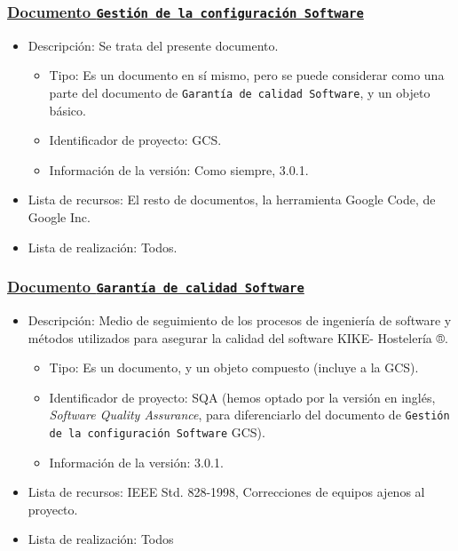 \documentclass[spanish,a4paper,11pt, twoside]{report}	%
\begin{document}
			\subsubsection{\underline{Documento \texttt{Gestión de la configuración Software}}}
			\begin{itemize}	
				\item{Descripción:} Se trata del presente documento.
					\begin{itemize}	
						\item{Tipo:} Es un documento en sí mismo, pero se puede considerar como una parte del documento de \texttt{Garantía de calidad Software}, y un objeto básico. 
						\item{Identificador de proyecto:} GCS.
						\item{Información de la versión:} Como siempre, 3.0.1.
					\end{itemize}	
				\item{Lista de recursos:} El resto de documentos, la herramienta Google Code, de Google Inc.
				\item{Lista de realización:} Todos.
			\end{itemize}	

			\subsubsection{\underline{Documento \texttt{Garantía de calidad Software}}}
			\begin{itemize}	
				\item{Descripción:} Medio de seguimiento de los procesos de ingeniería de software y métodos utilizados para asegurar la calidad del software KIKE- Hostelería ®.
					\begin{itemize}	
						\item{Tipo:} Es un documento, y un objeto compuesto (incluye a la GCS). 
						\item{Identificador de proyecto:} SQA (hemos optado por la versión en inglés, \textit{Software Quality Assurance}, para diferenciarlo del documento de \texttt{Gestión de la configuración Software} GCS).
						\item{Información de la versión:} 3.0.1.
					\end{itemize}	
				\item{Lista de recursos:} IEEE Std. 828-1998, Correcciones de equipos ajenos al proyecto.
				\item{Lista de realización:} Todos
			\end{itemize}	
\end{document}
